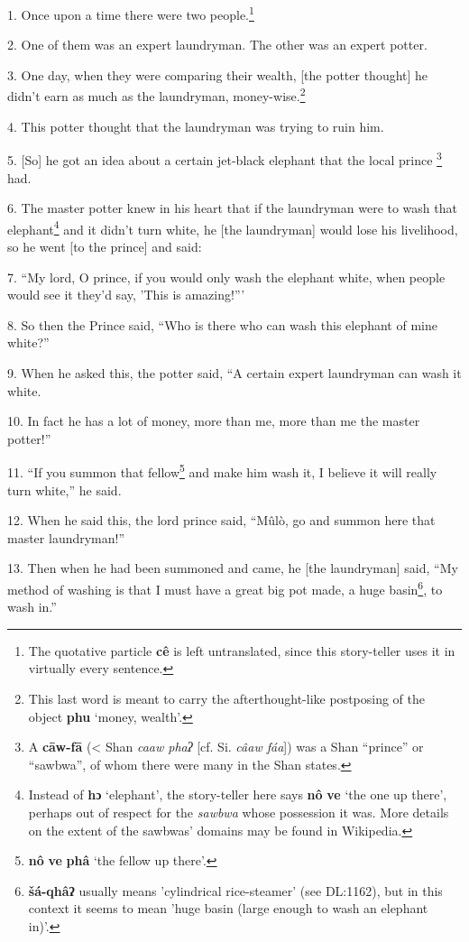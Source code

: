 \setcounter{footnote}{0}

1. Once upon a time there were two people.\footnote{The quotative particle \textbf{cê} is left untranslated, since this story-teller uses it in virtually every sentence.}

2. One of them was an expert laundryman. The other was an expert potter.

3. One day, when they were comparing their wealth, [the potter thought] he didn't
earn as much as the laundryman, money-wise.\footnote{This last word is meant to carry the afterthought-like postposing of the object \textbf{phu} `money, wealth'.}

4. This potter thought that the laundryman was trying to ruin him.

5. [So] he got an idea about a certain jet-black elephant that the local prince
\footnote{A \textbf{cāw-fā} (< Shan \textit{caaw phaʔ} [cf. Si. \textit{câaw fáa}]) was a Shan ``prince'' or ``sawbwa'', of whom there were many in the Shan states.} had.

6. The master potter knew in his heart that if the laundryman were to wash that
elephant\footnote{Instead of \textbf{hɔ} `elephant', the story-teller here says \textbf{nô} \textbf{ve} `the one up there', perhaps out of respect for the \textit{sawbwa} whose possession it was. More details on the extent of the sawbwas' domains may be found in Wikipedia.} and it didn't turn white, he [the laundryman] would lose his livelihood,
so he went [to the prince] and said:

7. ``My lord, O prince, if you would only wash the elephant white, when people
would see it they'd say, 'This is amazing!'''

8. So then the Prince said, ``Who is there who can wash this elephant of mine white?''

9. When he asked this, the potter said, ``A certain expert laundryman can wash
it white.

10. In fact he has a lot of money, more than me, more than me the master potter!''

11. ``If you summon that fellow\footnote{\textbf{nô} \textbf{ve} \textbf{phâ} `the fellow up there'.} and make him wash it, I believe it will really
turn white,'' he said.

12. When he said this, the lord prince said, ``Mûlò, go and summon here that
master laundryman!''

13. Then when he had been summoned and came, he [the laundryman] said, ``My method
of washing is that I must have a great big pot made, a huge basin\footnote{\textbf{šá-qhâʔ} usually means 'cylindrical rice-steamer' (see DL:1162), but in this context it seems to mean 'huge basin (large enough to wash an elephant in)'.}, to wash
in.''

